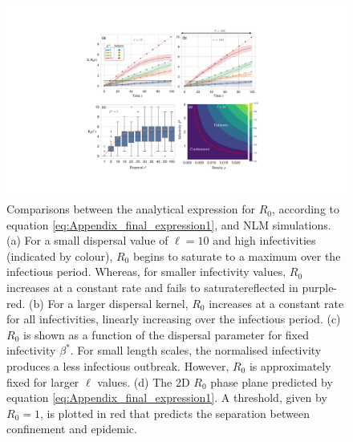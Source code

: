\begin{figure}
    \centering
    \includegraphics[scale=0.40]{chapter5/figures/fig3-R0-analytic.pdf}
    \caption{Comparisons between the analytical expression for $R_0$, according to equation \ref{eq:Appendix_final_expression1}, and NLM simulations. (a) For a small dispersal value of $\ell=10$ and high infectivities (indicated by colour), $R_0$ begins to saturate to a maximum over the infectious period. Whereas, for smaller infectivity values, $R_0$ increases at a constant rate and fails to saturate\textemdash reflected in purple-red. (b) For a larger dispersal kernel, $R_0$ increases at a constant rate for all infectivities, linearly increasing over the infectious period. (c) $R_0$ is shown as a function of the dispersal parameter for fixed infectivity $\beta^*$. For small length scales, the normalised infectivity produces a less infectious outbreak. However, $R_0$ is approximately fixed for larger $\ell$ values. (d) The 2D $R_0$ phase plane predicted by equation \ref{eq:Appendix_final_expression1}. A threshold, given by $R_0=1$, is plotted in red that predicts the separation between confinement and epidemic.}
    \label{fig:my_label}
\end{figure}

